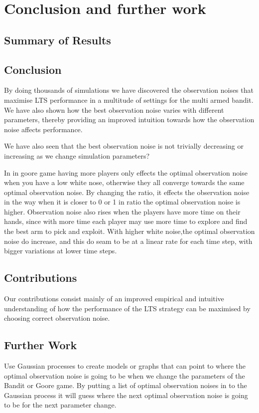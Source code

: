 \chapter{Conclusion and further work}
\label{ch:conclusion}

\section{Summary of Results}

\section{Conclusion}

By doing thousands of simulations we have discovered the observation noises that maximise LTS performance in a multitude of settings for the multi armed bandit.
We have also shown how the best observation noise varies with different parameters, thereby providing an improved intuition towards how the observation noise affects performance.

We have also seen that the best observation noise is not trivially decreasing or increasing as we change simulation parameters?

In in goore game having more players only effects the optimal observation noise when you have a low white nose,
otherwise they all converge towards the same optimal observation noise. By changing the ratio, it effects the observation
noise in the way when it is closer to 0 or 1 in ratio the optimal observation noise is higher.
Observation noise also rises when the players have more time on their hands, since with more time each player may use more time 
to explore and find the best arm to pick and exploit. With higher white noise,the optimal observation noise do 
increase, and this do seam to be at a linear rate for each time step, with bigger variations at lower time steps.

\section{Contributions}
Our contributions consist mainly of an improved empirical and intuitive understanding of how the performance of the LTS strategy can be maximised by choosing correct observation noise.


\section{Further Work}
Use Gaussian processes to create models or graphs that can point to where the optimal observation noise is going to be
when we change the parameters of the Bandit or Goore game. By putting a list of optimal observation noises in to the
Gaussian process it will guess where the next optimal observation noise is going to be for the next parameter change.

